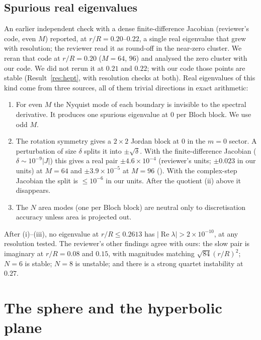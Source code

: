 \documentclass[11pt]{article}
\theoremstyle{definition}
\theoremstyle{remark}
\newcommand{\code}[1]{\path{#1}}
\newcommand{\re}{\operatorname{Re}}
\begin{document}
\subsection{Spurious real eigenvalues}\label{sec:spurious}
An earlier independent check with a dense finite-difference Jacobian (reviewer's code, even $M$) reported, at
$r/R=0.20$--$0.22$, a single real eigenvalue that grew with resolution; the reviewer read it as round-off in the near-zero cluster. We reran that code at $r/R=0.20$ ($M=64$, $96$) and analysed the zero cluster with our code. We did not rerun it at $0.21$ and $0.22$; with our code those points are stable (Result~\ref{res:hept}, with resolution checks at both). Real eigenvalues of this kind come from three sources, all of them
trivial directions in exact arithmetic:
\begin{enumerate}
\item For even $M$ the Nyquist mode of each boundary is invisible to the spectral derivative. It produces one spurious
eigenvalue at $0$ per Bloch block. We use odd $M$.
\item The rotation symmetry gives a $2\times2$ Jordan block at $0$ in the $m=0$ sector. A perturbation of size $\delta$ splits
it into $\pm\sqrt\delta$. With the finite-difference Jacobian ($\delta\sim10^{-9}|J|$) this gives a real pair
$\pm4.6\times10^{-4}$ (reviewer's units; $\pm0.023$ in our units) at $M=64$ and $\pm3.9\times10^{-5}$ at $M=96$
(\code{outputs/ngon_reviewer_a020.out}). With the complex-step Jacobian the split is $\le10^{-6}$ in our units. After the
quotient (ii) above it disappears.
\item The $N$ area modes (one per Bloch block) are neutral only to discretisation accuracy unless area is projected out.
\end{enumerate}
After (i)--(iii), no eigenvalue at $r/R\le0.2613$ has $|\re\lambda|>2\times10^{-10}$, at any resolution tested. The reviewer's
other findings agree with ours: the slow pair is imaginary at $r/R=0.08$ and $0.15$, with magnitudes matching
$\sqrt{84}(r/R)^2$; $N=6$ is stable; $N=8$ is unstable; and there is a strong quartet instability at $0.27$.

\section{The sphere and the hyperbolic plane}\label{sec:curved}
\end{document}

